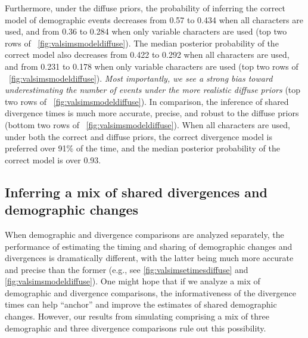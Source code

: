 \ifembed{

}{}

Furthermore, under the diffuse priors, the probability of inferring the correct
model of demographic events decreases from 0.57 to 0.434 when all characters
are used, and from 0.36 to 0.284 when only variable characters are used
(top two rows of \fig{}~\ref{fig:valsimsmodeldiffuse}).
The median posterior probability of the correct model also decreases from
0.422 to 0.292 when all characters are used,
and from 0.231 to 0.178 when only variable characters are used
(top two rows of \fig{}~\ref{fig:valsimsmodeldiffuse}).
\emph{Most importantly, we see a strong bias toward underestimating the number
    of events under the more realistic diffuse priors}
(top two rows of \fig{}~\ref{fig:valsimsmodeldiffuse}).
In comparison, the inference of shared divergence times is much more accurate,
precise, and robust to the diffuse priors
(bottom two rows of \fig{}~\ref{fig:valsimsmodeldiffuse}).
When all characters are used, under both the correct and diffuse
priors, the correct divergence model is preferred over 91\% of the time,
and the median posterior probability of the correct model is over
0.93.

\ifembed{

}{}


\subsection{Inferring a mix of shared divergences and demographic changes}

When demographic and divergence comparisons are analyzed separately, the
performance of estimating the timing and sharing of demographic changes and
divergences is dramatically different, with the latter being much more accurate
and precise than the former
(e.g., see
\figs
\ref{fig:valsimsetimesdiffuse}
and
\ref{fig:valsimsmodeldiffuse}).
One might hope that
if we analyze a mix of demographic and divergence comparisons,
the informativeness of the divergence times can help ``anchor'' and
improve the estimates of shared demographic changes.
However, our results from simulating \datasets comprising a mix of three
demographic and three divergence comparisons rule out this possibility.

